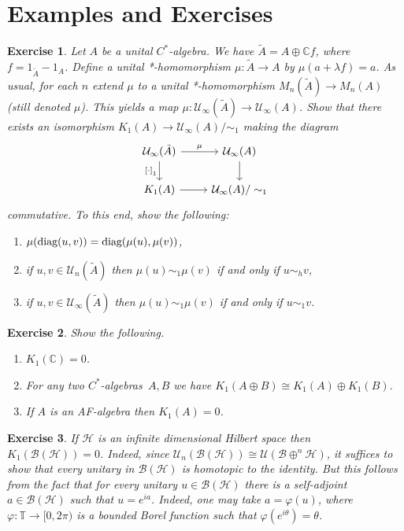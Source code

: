 \documentclass{book}
\newtheorem{exercise}{Exercise}[section]
\def\cstar{\(C^*\)-algebra}
\def\cstars{\(C^*\)-algebras}
\def\diag{\textnormal{diag}}
\begin{document}
\section{Examples and Exercises}

\begin{exercise}\label{ex:731}
  Let \(A\) be a unital \cstar. We have \(\tilde{A}=A\oplus\mathbb{C}f\), where \(f=1_{\tilde{A}}-1_A\).
  Define a unital *-homomorphism \(\mu:\tilde{A}\rightarrow A\) by \(\mu(a+\lambda f)=a\).
  As usual, for each \(n\) extend \(\mu\) to a unital *-homomorphism \(M_n(\tilde{A})\rightarrow M_n(A)\) (still denoted \(\mu\)).
  This yields a map \(\mu:\mathcal{U}_\infty(\tilde{A})\rightarrow\mathcal{U}_\infty(A)\). 
  Show that there exists an isomorphism \(K_1(A)\rightarrow\mathcal{U}_\infty(A)/\sim_1\) making the diagram
  \begin{equation}
    \begin{tikzcd}
      \mathcal{U}_\infty(\tilde{A}) \arrow[r,"\mu"] \arrow[d,swap,"{[\cdot]}_1"]&\mathcal{U}_\infty(A)\arrow[d]\\
      K_1(A)\arrow[r]&\mathcal{U}_\infty(A)/\sim_1
    \end{tikzcd}
  \end{equation}
  commutative. To this end, show the following:
  \begin{enumerate}
    \item \(\mu(\diag(u,v))=\diag(\mu(u),\mu(v))\),
    \item if \(u,v\in\mathcal{U}_n(\tilde{A})\) then \(\mu(u)\sim_1\mu(v)\) if and only if \(u\sim_h v\),
    \item if \(u,v\in\mathcal{U}_\infty(\tilde{A})\) then \(\mu(u)\sim_1\mu(v)\) if and only if \(u\sim_1 v\).
  \end{enumerate}
\end{exercise}

\begin{exercise}\label{ex:732}
  Show the following.
  \begin{enumerate}
    \item \(K_1(\mathbb{C})=0\).
    \item For any two \cstars\ \(A,B\) we have \(K_1(A\oplus B)\cong K_1(A)\oplus K_1(B)\).
    \item If \(A\) is an AF-algebra then \(K_1(A)=0\).
  \end{enumerate}
\end{exercise}

\begin{exercise}\label{ex:733}
  If \(\mathcal{H}\) is an infinite dimensional Hilbert space then \(K_1(\mathcal{B}(\mathcal{H}))=0\).
  Indeed, since \(\mathcal{U}_n(\mathcal{B}(\mathcal{H}))\cong\mathcal{U}(\mathcal{B}\oplus^n\mathcal{H})\), it suffices to show that every unitary 
  in \(\mathcal{B}(\mathcal{H})\) is homotopic to the identity. But this follows from the fact that for every unitary \(u\in\mathcal{B}(\mathcal{H})\)
  there is a self-adjoint \(a\in\mathcal{B}(\mathcal{H})\) such that \(u=e^{ia}\). Indeed, one may take \(a=\varphi(u)\),
  where \(\varphi:\mathbb{T}\rightarrow[0,2\pi)\) is a bounded Borel function such that \(\varphi(e^{i\theta})=\theta\).
\end{exercise}
\end{document}
